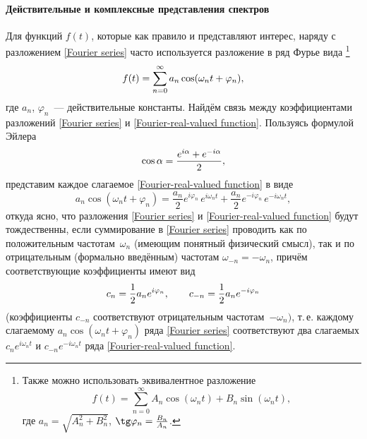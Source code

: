 \paragraph{Действительные и комплексные представления спектров}
Для  функций $f(t)$, которые как правило и представляют интерес,
наряду с разложением \eqref{Fourier series} часто используется разложение
в ряд Фурье вида%
\footnote{Также можно использовать эквивалентное разложение
\[
f(t)=\sum\limits_{n=0}^{\infty} A_n \cos(\omega_n t) + B_n \sin(\omega_n t),
\]
где $a_n=\sqrt{A_n^2+B_n^2}$, $\tg \varphi_n = \frac{B_n}{A_n}$.}
\begin{equation}
    \eqmark{Fourier-real-valued function}
    f(t)=\sum\limits_{n=0}^{\infty} a_n \cos(\omega_n t+\varphi_n ),
\end{equation}
где $a_n$, $\varphi_n$~--- действительные константы. Найдём связь между
коэффициентами разложений \eqref{Fourier series} и \eqref{Fourier-real-valued function}.
Пользуясь формулой Эйлера
\begin{equation}
    \eqmark{euler}
    \cos\alpha=\frac{e^{i\alpha}+e^{-i\alpha}}{2},
\end{equation}
представим каждое слагаемое \eqref{Fourier-real-valued function} в виде
\begin{equation*}
    a_n\cos(\omega_nt+\varphi_n)=\frac{a_n}{2}e^{i\varphi_n}\,e^{i\omega_n
t}+\frac{a_n}{2}e^{-i\varphi_n}\,e^{-i\omega_n t},
\end{equation*}
откуда ясно, что разложения \eqref{Fourier series} и
\eqref{Fourier-real-valued function} будут тождественны, если суммирование в
\eqref{Fourier series} проводить как по положительным частотам~$\omega_n$
(имеющим понятный физический смысл), так и по отрицательным (формально введённым)
частотам $\omega_{-n}=-\omega_n$, причём соответствующие коэффициенты имеют вид
\begin{equation}
    \eqmark{Fourier-coefficient}
    c_n =\frac{1}{2}a_n e^{i\varphi_n},
    \qquad c_{-n}=\frac{1}{2}a_n e^{-i\varphi_n}
\end{equation}
(коэффициенты $c_{-n}$ соответствуют отрицательным частотам~$-\omega_n)$,
т.\,е. каждому слагаемому $a_n\cos(\omega_nt+\varphi_n)$ ряда \eqref{Fourier series}
соответствуют два слагаемых $c_ne^{i\omega_n t}$ и
$c_{-n}e^{-i\omega_n t}$ ряда \eqref{Fourier-real-valued function}.


